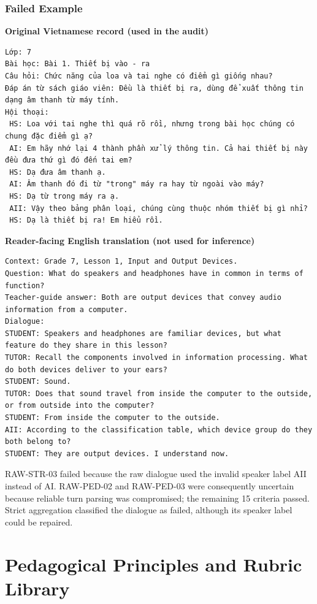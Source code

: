 \documentclass[conference]{IEEEtran}
\begin{document}
\subsubsection{Failed Example}
\noindent\textbf{Original Vietnamese record (used in the audit)}
\begin{Verbatim}[breaklines=true,breakanywhere=true,fontsize=\footnotesize,formatcom=\rmfamily]
Lớp: 7
Bài học: Bài 1. Thiết bị vào - ra
Câu hỏi: Chức năng của loa và tai nghe có điểm gì giống nhau?
Đáp án từ sách giáo viên: Đều là thiết bị ra, dùng để xuất thông tin dạng âm thanh từ máy tính.
Hội thoại:
 HS: Loa với tai nghe thì quá rõ rồi, nhưng trong bài học chúng có chung đặc điểm gì ạ?
 AI: Em hãy nhớ lại 4 thành phần xử lý thông tin. Cả hai thiết bị này đều đưa thứ gì đó đến tai em?
 HS: Dạ đưa âm thanh ạ.
 AI: Âm thanh đó đi từ "trong" máy ra hay từ ngoài vào máy?
 HS: Dạ từ trong máy ra ạ. 
 AII: Vậy theo bảng phân loại, chúng cùng thuộc nhóm thiết bị gì nhỉ?
 HS: Dạ là thiết bị ra! Em hiểu rồi.
\end{Verbatim}
\noindent\textbf{Reader-facing English translation (not used for inference)}
\begin{Verbatim}[breaklines=true,breakanywhere=true,fontsize=\footnotesize,formatcom=\rmfamily]
Context: Grade 7, Lesson 1, Input and Output Devices.
Question: What do speakers and headphones have in common in terms of function?
Teacher-guide answer: Both are output devices that convey audio information from a computer.
Dialogue:
STUDENT: Speakers and headphones are familiar devices, but what feature do they share in this lesson?
TUTOR: Recall the components involved in information processing. What do both devices deliver to your ears?
STUDENT: Sound.
TUTOR: Does that sound travel from inside the computer to the outside, or from outside into the computer?
STUDENT: From inside the computer to the outside.
AII: According to the classification table, which device group do they both belong to?
STUDENT: They are output devices. I understand now.
\end{Verbatim}
RAW-STR-03 failed because the raw dialogue used the invalid speaker label AII instead of AI. RAW-PED-02 and RAW-PED-03 were consequently uncertain because reliable turn parsing was compromised; the remaining 15 criteria passed. Strict aggregation classified the dialogue as failed, although its speaker label could be repaired.

\clearpage
\section{Pedagogical Principles and Rubric Library}
\label{app:principles-rubrics}
\end{document}
